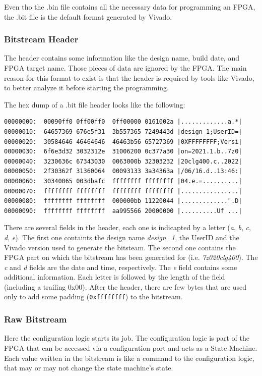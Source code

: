 Even tho the .bin file contains all the necessary data for programming an FPGA, the .bit file is the default format generated by Vivado.

\subsubsection{Bitstream Header}
The header contains some information like the design name, build date, and FPGA target name. Those pieces of data are ignored by the FPGA. The main reason for this format to exist is that the header is required by tools like Vivado, to better analyze it before starting the programming. \bigskip

The hex dump of a .bit file header looks like the following:

\begin{lstlisting}[style=preformatted]
00000000:  00090ff0 0ff00ff0  0ff00000 0161002a |.............a.*|
00000010:  64657369 676e5f31  3b557365 7249443d |design_1;UserID=|
00000020:  30584646 46464646  46463b56 65727369 |0XFFFFFFFF;Versi|
00000030:  6f6e3d32 3032312e  31006200 0c377a30 |on=2021.1.b..7z0|
00000040:  3230636c 67343030  0063000b 32303232 |20clg400.c..2022|
00000050:  2f30362f 31360064  00093133 3a34363a |/06/16.d..13:46:|
00000060:  30340065 003dbafc  ffffffff ffffffff |04.e.=..........|
00000070:  ffffffff ffffffff  ffffffff ffffffff |................|
00000080:  ffffffff ffffffff  000000bb 11220044 |.............".D|
00000090:  ffffffff ffffffff  aa995566 20000000 |..........Uf ...|
\end{lstlisting}

There are several fields in the header, each one is indicapted by a letter (\textit{a}, \textit{b}, \textit{c}, \textit{d}, \textit{e}). The first one containts the design name \textit{design\_1}, the UserID and the Vivado version used to generate the bitsteam. The second one contains the FPGA part on which the bitstream has been generated for (i.e. \textit{7z020clg400}). The \textit{c} and \textit{d} fields are the date and time, respectively. The \textit{e} field contains some additional information. Each letter is followed by the length of the field (including a trailing 0x00). After the header, there are few bytes that are used only to add some padding (\texttt{0xffffffff}) to the bitstream. 

\subsubsection{Raw Bitstream}
\label{sec:raw_bitstream}
Here the configuration logic starts its job. The configuration logic is part of the FPGA that can be accessed via a configuration port and acts as a State Machine. Each value written in the bitstream is like a command to the configuration logic, that may or may not change the state machine's state. \bigskip

